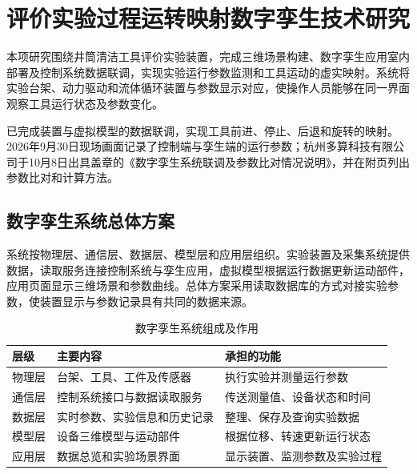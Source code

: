 \chapter{评价实验过程运转映射数字孪生技术研究}
\label{chap:r46-6}

本项研究围绕井筒清洁工具评价实验装置，完成三维场景构建、数字孪生应用室内部署及控制系统数据联调，实现实验运行参数监测和工具运动的虚实映射。系统将实验台架、动力驱动和流体循环装置与参数显示对应，使操作人员能够在同一界面观察工具运行状态及参数变化。

已完成装置与虚拟模型的数据联调，实现工具前进、停止、后退和旋转的映射。2026年9月30日现场画面记录了控制端与孪生端的运行参数；杭州多算科技有限公司于10月8日出具盖章的《数字孪生系统联调及参数比对情况说明》，并在附页列出参数比对和计算方法。

\section{数字孪生系统总体方案}
\label{sec:r46-6.1}

系统按物理层、通信层、数据层、模型层和应用层组织。实验装置及采集系统提供数据，读取服务连接控制系统与孪生应用，虚拟模型根据运行数据更新运动部件，应用页面显示三维场景和参数曲线。总体方案采用读取数据库的方式对接实验参数，使装置显示与参数记录具有共同的数据来源。

\begin{table}[H]
\centering
{}
\fontsize{12}{15}\selectfont
\setlength{\tabcolsep}{3pt}
\renewcommand{\arraystretch}{1.5}
\caption{数字孪生系统组成及作用}\label{tab:r46-6-1}
\begin{tabular}{>{\centering\arraybackslash}m{0.333333\dimexpr\linewidth-6\tabcolsep-4\arrayrulewidth\relax}>{\centering\arraybackslash}m{0.333333\dimexpr\linewidth-6\tabcolsep-4\arrayrulewidth\relax}>{\centering\arraybackslash}m{0.333333\dimexpr\linewidth-6\tabcolsep-4\arrayrulewidth\relax}}
\toprule
 层级 & 主要内容 & 承担的功能 \\ \midrule
物理层 & 台架、工具、工件及传感器 & 执行实验并测量运行参数 \\ 
通信层 & 控制系统接口与数据读取服务 & 传送测量值、设备状态和时间 \\ 
数据层 & 实时参数、实验信息和历史记录 & 整理、保存及查询实验数据 \\ 
模型层 & 设备三维模型与运动部件 & 根据位移、转速更新运行状态 \\ 
应用层 & 数据总览和实验场景界面 & 显示装置、监测参数及实验过程 \\ \bottomrule
\end{tabular}
\end{table}

